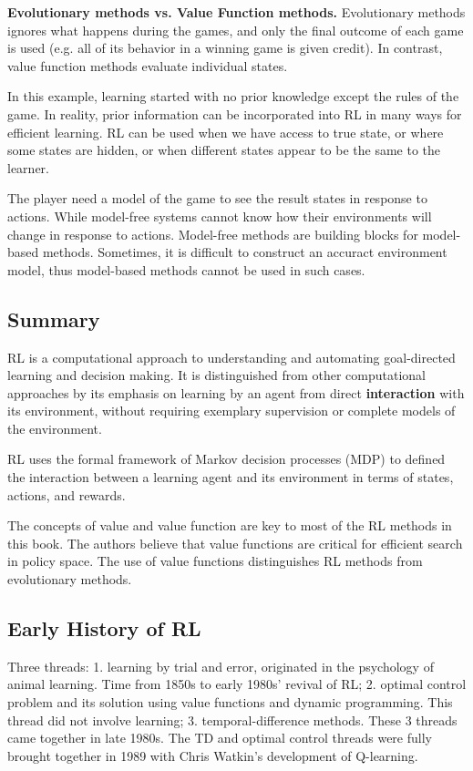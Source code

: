 \documentclass[lang=en,mode=geye,device=normal,color=blue,14pt]{elegantnote}
\DeclareMathOperator*{\1}{\mathbbm{1}}
\begin{document}
\textbf{Evolutionary methods vs. Value Function methods.} Evolutionary methods ignores what happens during the games, and only the final outcome of each game is used (e.g. all of its behavior in a winning game is given credit). In contrast, value function methods evaluate individual states.

In this example, learning started with no prior knowledge except the rules of the game. In reality, prior information can be incorporated into RL in many ways for efficient learning.
RL can be used when we have access to true state, or where some states are hidden, or when different states appear to be the same to the learner.

The player need a model of the game to see the result states in response to actions. While model-free systems cannot know how their environments will change in response to actions.
Model-free methods are building blocks for model-based methods.
Sometimes, it is difficult to construct an accuract environment model, thus model-based methods cannot be used in such cases.

\subsection{Summary}

RL is a computational approach to understanding and automating goal-directed learning and decision making.
It is distinguished from other computational approaches by its emphasis on learning by an agent from direct \textbf{interaction} with its environment, without requiring exemplary supervision or complete models of the environment.

RL uses the formal framework of Markov decision processes (MDP) to defined the interaction between a learning agent and its environment in terms of states, actions, and rewards.

The concepts of value and value function are key to most of the RL methods in this book.
The authors believe that value functions are critical for efficient search in policy space.
The use of value functions distinguishes RL methods from evolutionary methods.

\subsection{Early History of RL}

Three threads: 
1. learning by trial and error, originated in the psychology of animal learning. Time from 1850s to early 1980s' revival of RL;
2. optimal control problem and its solution using value functions and dynamic programming. This thread did not involve learning;
3. temporal-difference methods.
These 3 threads came together in late 1980s.
The TD and optimal control threads were fully brought together in 1989 with Chris Watkin's development of Q-learning.
\end{document}
